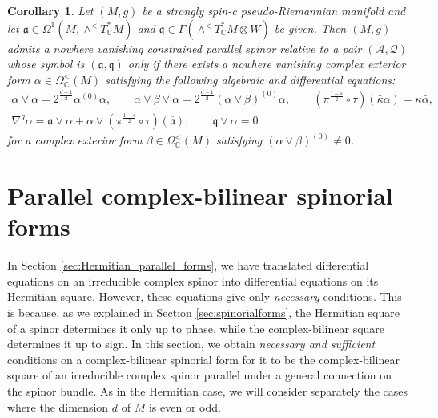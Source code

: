 \documentclass[10pt,a4paper,twoside,reqno]{amsart}
\theoremstyle{plain}
\newtheorem{cor}[thm]{Corollary}
\theoremstyle{definition}
\theoremstyle{remark}
\def\C{\mathbb{C}}
\def\cQ{\mathcal{Q}}
\def\fra{\mathfrak{a}}
\def\frq{\mathfrak{q}}
\def\cA{\mathcal{A}}
\begin{document}
\begin{cor}
\label{cor:odd_constrained_parallel_spinors}
Let $(M,g)$ be a strongly spin-c pseudo-Riemannian manifold and let $\fra\in\Omega^1(M,\wedge^< T^*_\C M)$ and $\frq\in\Gamma(\wedge^< T^*_\C M\otimes W)$ be given. Then $(M,g)$ admits a nowhere vanishing constrained parallel spinor relative to a pair $(\cA,\cQ)$ whose symbol is $(\fra,\frq)$ only if there exists a nowhere vanishing complex exterior form $\alpha\in\Omega^<_\C(M)$ satisfying the following algebraic and differential equations: 
\begin{gather*}
\alpha\vee\alpha = 2^{\frac{d-1}{2}}\alpha^{(0)}\alpha,\qquad \alpha\vee\beta\vee\alpha=2^{\frac{d-1}{2}}(\alpha\vee\beta)^{(0)}\alpha,\qquad(\pi^{\frac{1-s}{2}}\circ\tau)(\bar\kappa\alpha) = \kappa \bar{\alpha},\\
\nabla^g\alpha=\fra\vee\alpha+\alpha\vee(\pi^{\frac{1-s}{2}}\circ\tau)(\overline{\fra}),\qquad\frq\vee\alpha=0
\end{gather*} 
for a complex exterior form $\beta\in\Omega^<_\C(M)$ satisfying $(\alpha\vee\beta)^{(0)}\neq0$.
\end{cor}


\section{Parallel complex-bilinear spinorial forms}
\label{sec:Complex_bilinear_parallel_forms}


In Section \ref{sec:Hermitian_parallel_forms}, we have translated differential equations on an irreducible complex spinor into differential equations on its Hermitian square. However, these equations give only \emph{necessary} conditions. This is because, as we explained in Section \ref{sec:spinorialforms}, the Hermitian square of a spinor determines it only up to phase, while the complex-bilinear square determines it up to sign. In this section, we obtain \emph{necessary and sufficient} conditions on a complex-bilinear spinorial form for it to be the complex-bilinear square of an irreducible complex spinor parallel under a general connection on the spinor bundle. As in the Hermitian case, we will consider separately the cases where the dimension $d$ of $M$ is even or odd.
\end{document}

